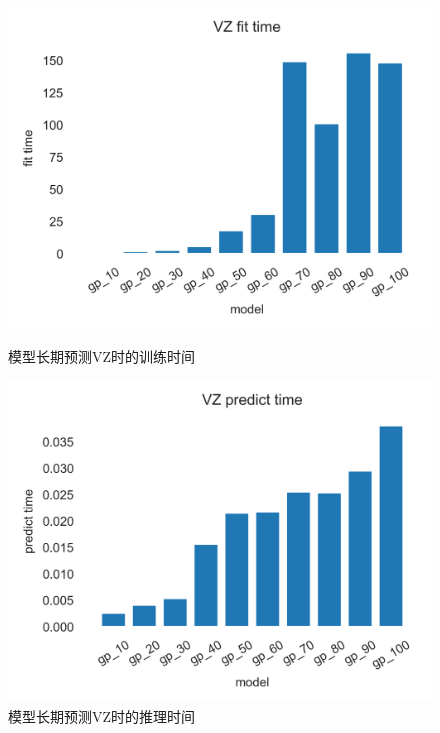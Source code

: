 \begin{figure}[!htbp]
    \centering
    \begin{minipage}[t]{0.49\textwidth}
    \centering
    \includegraphics[width=\textwidth]{images/lab2/VZ_fit_time.png}
    \caption{模型长期预测VZ时的训练时间}\label{2VZfittime}
    \end{minipage}
    \begin{minipage}[t]{0.49\textwidth}
    \centering
    \includegraphics[width=\textwidth]{images/lab2/VZ_predict_time.png}
    \caption{模型长期预测VZ时的推理时间}\label{2VZpredicttime}
    \end{minipage}
\end{figure}

